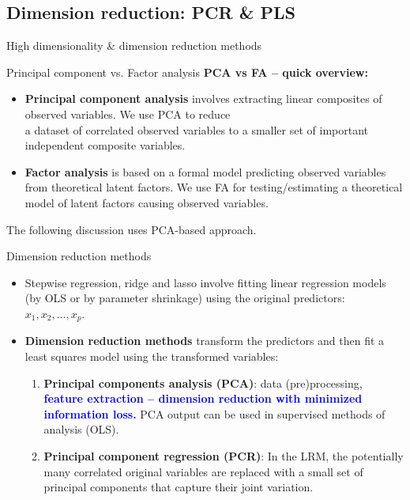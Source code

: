 \documentclass{beamer}
\begin{document}
\subsection{Dimension reduction: PCR \& PLS}
\begin{frame}{High dimensionality \& dimension reduction methods}
\end{frame}
\begin{frame}{Principal component vs. Factor analysis}
\textbf{PCA vs FA -- quick overview:}\\
\medskip
\begin{itemize}
\item \textbf{Principal component analysis} involves extracting linear composites of observed variables. We use PCA to reduce \\a dataset of correlated observed variables to a smaller set of important independent composite variables.
\bigskip
\item \textbf{Factor analysis} is based on a formal model predicting observed variables from theoretical latent factors. We use FA for testing/estimating a theoretical model of latent factors causing observed variables.
\end{itemize}
\bigskip
The following discussion uses PCA-based approach.
\end{frame}
\begin{frame}{Dimension reduction methods}
\begin{itemize}
\item Stepwise regression, ridge and lasso involve fitting linear regression models (by OLS or by parameter shrinkage) using the original predictors: $x_1, x_2, \dots , x_p$.
\medskip
\item \textbf{Dimension reduction methods} transform the
predictors and then fit a least squares model using the
transformed variables:
\begin{enumerate}
\bigskip
\item \textbf{Principal components analysis (PCA)}: data (pre)processing, \textcolor{blue}{\textbf{feature extraction -- dimension reduction with minimized information loss.}} PCA output can be used in supervised methods of analysis (OLS).
\bigskip
\item \textbf{Principal component regression (PCR)}:  In the LRM, the potentially many correlated original variables are replaced with a small set of principal components that capture their joint variation.
\end{enumerate}
\end{itemize}
\end{frame}
\end{document}
